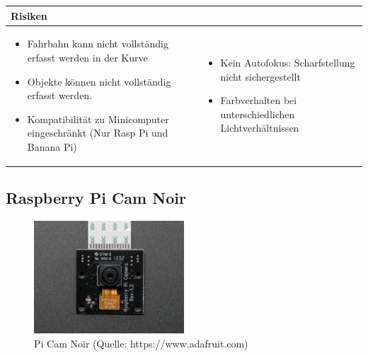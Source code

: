 \begin{table}[h]
\begin{tabular}{p{}p{}}


 \textbf{Risiken} & \\ \hline
	 
\begin{itemize}
\item Fahrbahn kann nicht vollständig erfasst werden in der Kurve
\item Objekte können nicht vollständig erfasst werden.
\item Kompatibilität zu Minicomputer eingeschränkt (Nur Rasp Pi und Banana Pi)
\end{itemize}
&
\begin{itemize}
\item Kein Autofokus: Scharfstellung nicht sichergestellt
\item Farbverhalten bei unterschiedlichen Lichtverhältnissen 
\end{itemize}

 
\end{tabular}
\end{table}

\pagebreak

\subsection{Raspberry Pi Cam Noir}

\begin{figure}[h!]%
\centering
\includegraphics[width=0.5\textwidth]{fig/raspberry-pi-camera-noir.jpg}
\caption{Pi Cam Noir (Quelle: https://www.adafruit.com)}
\label{fig:PiCamNoir}
\end{figure}

